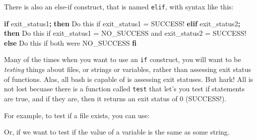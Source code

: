 \documentclass[]{krantz}
\makeatletter
\newenvironment{Shaded}{\begin{snugshade}}{\end{snugshade}}
\newcommand{\BuiltInTok}[1]{#1}
\newcommand{\CommentTok}[1]{\textcolor[rgb]{0.37,0.37,0.37}{\textit{#1}}}
\newcommand{\ExtensionTok}[1]{#1}
\newcommand{\KeywordTok}[1]{\textcolor[rgb]{0.27,0.27,0.27}{\textbf{#1}}}
\newcommand{\NormalTok}[1]{#1}
\newcommand{\VariableTok}[1]{\textcolor[rgb]{0,0,0}{#1}}
\newenvironment{kframe}{%
\medskip{}
\setlength{\fboxsep}{.8em}
 \def\at@end@of@kframe{}%
 \ifinner\ifhmode%
  \def\at@end@of@kframe{\end{minipage}}%
  \begin{minipage}{\columnwidth}%
 \fi\fi%
 \def\FrameCommand##1{\hskip\@totalleftmargin \hskip-\fboxsep
 \colorbox{shadecolor}{##1}\hskip-\fboxsep
     \hskip-\linewidth \hskip-\@totalleftmargin \hskip\columnwidth}%
 \MakeFramed {\advance\hsize-\width
   \@totalleftmargin\z@ \linewidth\hsize
   \@setminipage}}%
 {\par\unskip\endMakeFramed%
 \at@end@of@kframe}
\renewenvironment{Shaded}{\begin{kframe}}{\end{kframe}}
\makeatother
\begin{document}
There is also an else-if construct, that is named \texttt{elif}, with
syntax like this:

\begin{Shaded}
\begin{Highlighting}[]
\KeywordTok{if} \ExtensionTok{exit_status1}\KeywordTok{;} \KeywordTok{then}
  \ExtensionTok{Do}\NormalTok{ this if exit_status1 = SUCCESS!}
\KeywordTok{elif} \ExtensionTok{exit_status2}\KeywordTok{;} \KeywordTok{then}
  \ExtensionTok{Do}\NormalTok{ this if exit_status1 = NO_SUCCESS and exit_status2 = SUCCESS!}
\KeywordTok{else} 
  \ExtensionTok{Do}\NormalTok{ this if both were NO_SUCCESS}
\KeywordTok{fi}
\end{Highlighting}
\end{Shaded}

Many of the times when you want to use an \texttt{if} construct, you will
want to be \emph{testing} things about files, or strings or variables,
rather than assessing exit status of functions. Alas, all bash is
capable of is assessing exit statuses. But hark! All is not lost becuase
there is a function called \texttt{test} that let's you test if statements
are true, and if they are, then it returns an exit status of 0 (SUCCESS!).

For example, to test if a file exists, you can use:

\begin{Shaded}
\end{Shaded}

Or, if we want to test if the value of a variable is the same as
some string.

\begin{Shaded}
\end{Shaded}
\end{document}
